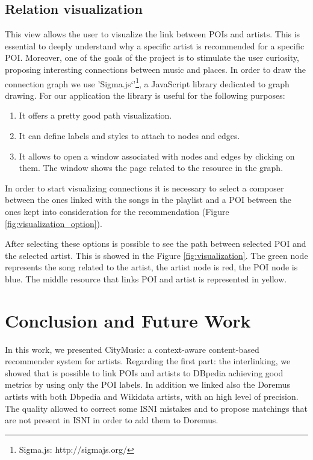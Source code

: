 \documentclass[paper=a4, fontsize=11pt]{scrartcl}
\begin{document}
\subsection{Relation visualization}
This view allows the user to visualize the link between POIs and artists. This is essential to deeply understand why a specific artist is recommended for a specific POI. Moreover, one of the goals of the project is to stimulate the user curiosity, proposing interesting connections between music and places.
In order to draw the connection graph we use 'Sigma.js`'\footnote{Sigma.js: http://sigmajs.org/}, a JavaScript library dedicated to graph drawing. For our application the library is useful for the following purposes:
\begin{enumerate}
\item It offers a pretty good path visualization.
\item It can define labels and styles to attach to nodes and edges.
\item It allows to open a window associated with nodes and edges by clicking on them. The window shows the page related to the resource in the graph.
\end{enumerate}
In order to start visualizing connections it is necessary to select a composer between the ones linked with the songs in the playlist and a POI between the ones kept into consideration for the recommendation (Figure \ref{fig:visualization_option}).

After selecting these options is possible to see the path between selected POI and the selected artist. This is showed in the Figure \ref{fig:visualization}. The green node represents the song related to the artist, the artist node is red, the POI node is blue. The middle resource that links POI and artist is represented in yellow.

\section{Conclusion and Future Work}
In this work, we presented CityMusic: a context-aware content-based recommender system for artists.
Regarding the first part: the interlinking, we showed that is possible to link POIs and artists to DBpedia achieving good metrics by using only the POI labels. In addition we linked also the Doremus artists with both Dbpedia and Wikidata artists, with an high level of precision. The quality allowed to correct some ISNI mistakes and to propose matchings that are not present in ISNI in order to add them to Doremus.
\end{document}
